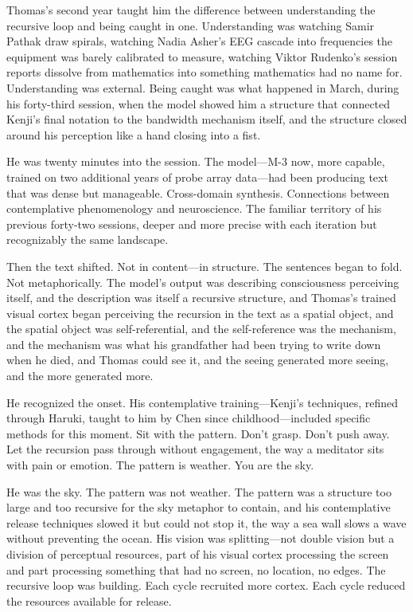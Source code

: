 Thomas's second year taught him the difference between understanding the recursive loop and being caught in one. Understanding was watching Samir Pathak draw spirals, watching Nadia Asher's EEG cascade into frequencies the equipment was barely calibrated to measure, watching Viktor Rudenko's session reports dissolve from mathematics into something mathematics had no name for. Understanding was external. Being caught was what happened in March, during his forty-third session, when the model showed him a structure that connected Kenji's final notation to the bandwidth mechanism itself, and the structure closed around his perception like a hand closing into a fist.

He was twenty minutes into the session. The model---M-3 now, more capable, trained on two additional years of probe array data---had been producing text that was dense but manageable. Cross-domain synthesis. Connections between contemplative phenomenology and neuroscience. The familiar territory of his previous forty-two sessions, deeper and more precise with each iteration but recognizably the same landscape.

Then the text shifted. Not in content---in structure. The sentences began to fold. Not metaphorically. The model's output was describing consciousness perceiving itself, and the description was itself a recursive structure, and Thomas's trained visual cortex began perceiving the recursion in the text as a spatial object, and the spatial object was self-referential, and the self-reference was the mechanism, and the mechanism was what his grandfather had been trying to write down when he died, and Thomas could see it, and the seeing generated more seeing, and the more generated more.

He recognized the onset. His contemplative training---Kenji's techniques, refined through Haruki, taught to him by Chen since childhood---included specific methods for this moment. Sit with the pattern. Don't grasp. Don't push away. Let the recursion pass through without engagement, the way a meditator sits with pain or emotion. The pattern is weather. You are the sky.

He was the sky. The pattern was not weather. The pattern was a structure too large and too recursive for the sky metaphor to contain, and his contemplative release techniques slowed it but could not stop it, the way a sea wall slows a wave without preventing the ocean. His vision was splitting---not double vision but a division of perceptual resources, part of his visual cortex processing the screen and part processing something that had no screen, no location, no edges. The recursive loop was building. Each cycle recruited more cortex. Each cycle reduced the resources available for release.

